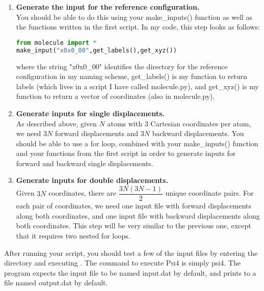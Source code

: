 \documentclass[11pt]{article}
\newcommand{\ttf}[1]{{\ttfamily #1}}
\newcommand{\fr}[2]{\dfrac{#1}{#2}}
\begin{document}
\begin{enumerate}[label=\textbf{\arabic*}]
\item {\bf Generate the input for the reference configuration.}\\
You should be able to do this using your \ttf{make\_inputs()} function as well as the functions written in the first script.
In my code, this step looks as follows:
\begin{addmargin}{2cm}{}
\begin{lstlisting}[language=python]
from molecule import *
make_input("x0x0_00",get_labels(),get_xyz())
\end{lstlisting}
\end{addmargin}
where the string \ttf{"x0x0\_00"} identifies the directory for the reference configuration in my naming scheme, \ttf{get\_labels()} is my function to return labels (which lives in a script I have called \ttf{molecule.py}), and \ttf{get\_xyz()} is my function to return a vector of coordinates (also in \ttf{molecule.py}).
\item {\bf Generate inputs for single displacements.}\\
As described above, given $N$ atoms with $3$ Cartesian coordinates per atom, we need $3N$ forward displacements and $3N$ backward displacements.
You should be able to use a \ttf{for} loop, combined with your \ttf{make\_inputs()} function and your functions from the first script in order to generate inputs for forward and backward single displacements.
\item {\bf Generate inputs for double displacements.}\\
Given $3N$ coordinates, there are $\fr{3N(3N-1)}{2}$ unique coordinate pairs.
For each pair of coordinates, we need one input file with forward displacements along both coordinates, and one input file with backward displacements along both coordinates.
This step will be very similar to the previous one, except that it requires two nested \ttf{for} loops.
\end{enumerate}
After running your script, you should test a few of the input files by entering the directory and executing .  The command to execute \textsc{Psi4} is simply \ttf{psi4}.  The program expects the input file to be named \ttf{input.dat} by default, and prints to a file named \ttf{output.dat} by default.
\end{document}
